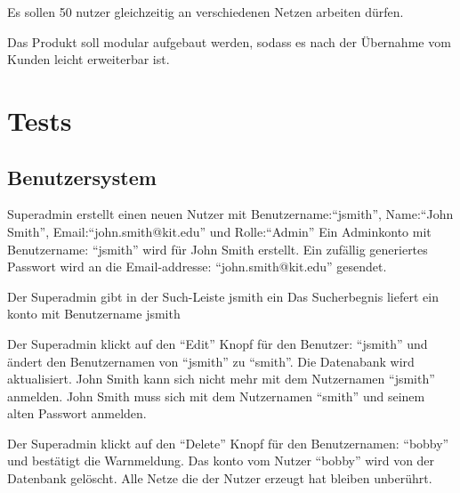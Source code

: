 \documentclass[parskip=full,11pt,twoside]{scrartcl}
\begin{document}
Es sollen 50 \Gls{nutzer} gleichzeitig an verschiedenen Netzen arbeiten dürfen. 


Das Produkt soll \gls{modular} aufgebaut werden, sodass es nach der Übernahme vom Kunden leicht erweiterbar ist. 

\section{Tests}


\subsection{Benutzersystem}


{Superadmin erstellt einen neuen Nutzer mit Benutzername:\enquote{jsmith}, Name:\enquote{John Smith}, Email:\enquote{john.smith@kit.edu} und Rolle:\enquote{Admin}}
{Ein Adminkonto mit Benutzername: \enquote{jsmith} wird für John Smith erstellt. Ein zufällig generiertes Passwort wird an die Email-addresse: \enquote{john.smith@kit.edu} gesendet.}

{Der Superadmin gibt in der Such-Leiste jsmith ein}
{Das Sucherbegnis liefert ein \Gls{konto} mit Benutzername jsmith}

{Der Superadmin klickt auf den \enquote{Edit} Knopf für den Benutzer: \enquote{jsmith} und ändert den Benutzernamen von \enquote{jsmith} zu \enquote{smith}.}
{Die Datenabank wird aktualisiert. John Smith kann sich nicht mehr mit dem Nutzernamen \enquote{jsmith} anmelden. John Smith muss sich mit dem Nutzernamen \enquote{smith} und seinem alten Passwort anmelden.}

{Der Superadmin klickt auf den \enquote{Delete} Knopf für den Benutzernamen: \enquote{bobby} und bestätigt die Warnmeldung.}
{Das \Gls{konto} vom Nutzer \enquote{bobby} wird von der Datenbank gelöscht. Alle Netze die der Nutzer erzeugt hat bleiben unberührt.}
\end{document}
